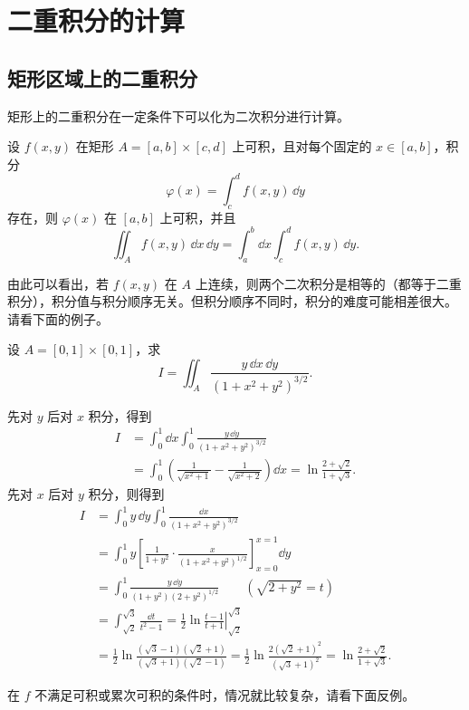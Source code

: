 \section{二重积分的计算}

\subsection{矩形区域上的二重积分}

矩形上的二重积分在一定条件下可以化为二次积分进行计算。

设 $f(x,y)$ 在矩形 $A=[a,b]\times[c,d]$ 上可积，且对每个固定的 $x\in[a,b]$，积分
\[
  \varphi(x)=\int_c^d f(x,y)\,\dd y
\]
存在，则 $\varphi(x)$ 在 $[a,b]$ 上可积，并且
\[
  \iint_A f(x,y)\,\dd x\,\dd y
  =\int_a^b\dd x\int_c^d f(x,y)\,\dd y.
\]

由此可以看出，若 $f(x,y)$ 在 $A$ 上连续，则两个二次积分是相等的（都等于二重积分），积分值与积分顺序无关。但积分顺序不同时，积分的难度可能相差很大。请看下面的例子。

\begin{xexample}[22.2.1]
设 $A=[0,1]\times[0,1]$，求
\[
  I=\iint_A\frac{y\,\dd x\,\dd y}{(1+x^2+y^2)^{3/2}}.
\]
\end{xexample}
\begin{xsolution}
先对 $y$ 后对 $x$ 积分，得到
\begin{align*}
  I&=\int_0^1\dd x\int_0^1\frac{y\,\dd y}{(1+x^2+y^2)^{3/2}}\\
   &=\int_0^1\left(\frac1{\sqrt{x^2+1}}-\frac1{\sqrt{x^2+2}}\right)\dd x
   =\ln\frac{2+\sqrt2}{1+\sqrt3}.
\end{align*}
先对 $x$ 后对 $y$ 积分，则得到
\begin{align*}
  I&=\int_0^1 y\,\dd y\int_0^1\frac{\dd x}{(1+x^2+y^2)^{3/2}}\\
   &=\int_0^1 y\left[\frac1{1+y^2}\cdot\frac{x}{(1+x^2+y^2)^{1/2}}\right]_{x=0}^{x=1}\dd y\\
   &=\int_0^1\frac{y\,\dd y}{(1+y^2)(2+y^2)^{1/2}}\qquad(\sqrt{2+y^2}=t)\\
   &=\int_{\sqrt2}^{\sqrt3}\frac{\dd t}{t^2-1}
   =\frac12\ln\left.\frac{t-1}{t+1}\right|_{\sqrt2}^{\sqrt3}\\
   &=\frac12\ln\frac{(\sqrt3-1)(\sqrt2+1)}{(\sqrt3+1)(\sqrt2-1)}
   =\frac12\ln\frac{2(\sqrt2+1)^2}{(\sqrt3+1)^2}
   =\ln\frac{2+\sqrt2}{1+\sqrt3}.
\end{align*}
\end{xsolution}

在 $f$ 不满足可积或累次可积的条件时，情况就比较复杂，请看下面反例。

